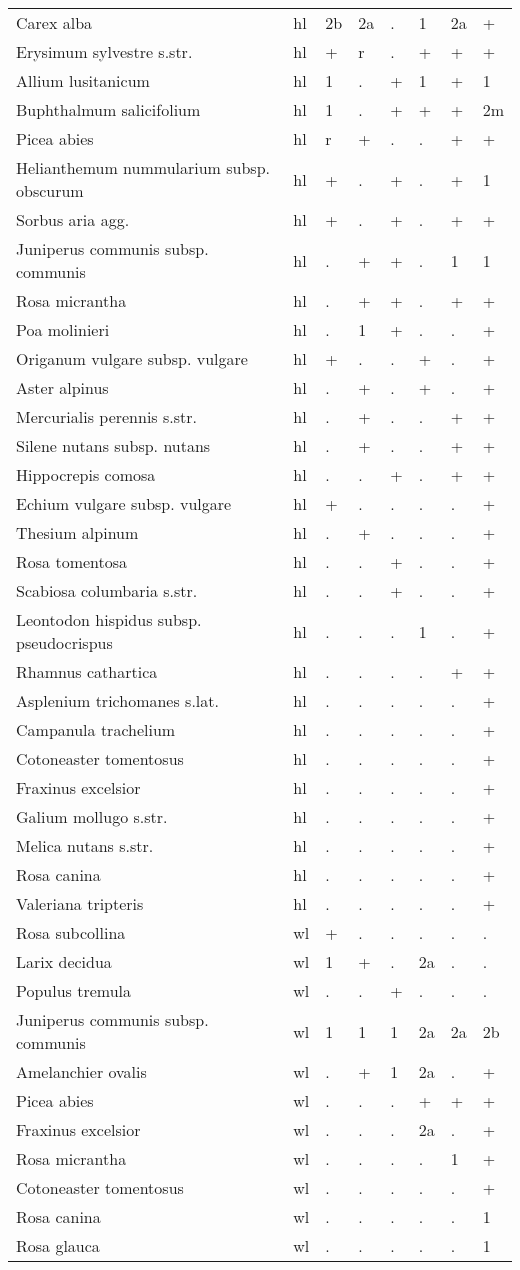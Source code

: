 \begin{longtable}{p{70mm}p{10mm}p{10mm}p{10mm}p{10mm}p{10mm}p{10mm}p{10mm}}
Carex alba&hl&2b&2a&.&1&2a&+\tabularnewline
Erysimum sylvestre s.str.&hl&+&r&.&+&+&+\tabularnewline
Allium lusitanicum&hl&1&.&+&1&+&1\tabularnewline
Buphthalmum salicifolium&hl&1&.&+&+&+&2m\tabularnewline
Picea abies&hl&r&+&.&.&+&+\tabularnewline
Helianthemum nummularium subsp. obscurum&hl&+&.&+&.&+&1\tabularnewline
Sorbus aria agg.&hl&+&.&+&.&+&+\tabularnewline
Juniperus communis subsp. communis&hl&.&+&+&.&1&1\tabularnewline
Rosa micrantha&hl&.&+&+&.&+&+\tabularnewline
Poa molinieri&hl&.&1&+&.&.&+\tabularnewline
Origanum vulgare subsp. vulgare&hl&+&.&.&+&.&+\tabularnewline
Aster alpinus&hl&.&+&.&+&.&+\tabularnewline
Mercurialis perennis s.str.&hl&.&+&.&.&+&+\tabularnewline
Silene nutans subsp. nutans&hl&.&+&.&.&+&+\tabularnewline
Hippocrepis comosa&hl&.&.&+&.&+&+\tabularnewline
Echium vulgare subsp. vulgare&hl&+&.&.&.&.&+\tabularnewline
Thesium alpinum&hl&.&+&.&.&.&+\tabularnewline
Rosa tomentosa&hl&.&.&+&.&.&+\tabularnewline
Scabiosa columbaria s.str.&hl&.&.&+&.&.&+\tabularnewline
Leontodon hispidus subsp. pseudocrispus&hl&.&.&.&1&.&+\tabularnewline
Rhamnus cathartica&hl&.&.&.&.&+&+\tabularnewline
Asplenium trichomanes s.lat.&hl&.&.&.&.&.&+\tabularnewline
Campanula trachelium&hl&.&.&.&.&.&+\tabularnewline
Cotoneaster tomentosus&hl&.&.&.&.&.&+\tabularnewline
Fraxinus excelsior&hl&.&.&.&.&.&+\tabularnewline
Galium mollugo s.str.&hl&.&.&.&.&.&+\tabularnewline
Melica nutans s.str.&hl&.&.&.&.&.&+\tabularnewline
Rosa canina&hl&.&.&.&.&.&+\tabularnewline
Valeriana tripteris&hl&.&.&.&.&.&+\tabularnewline
Rosa subcollina&wl&+&.&.&.&.&.\tabularnewline
Larix decidua&wl&1&+&.&2a&.&.\tabularnewline
Populus tremula&wl&.&.&+&.&.&.\tabularnewline
Juniperus communis subsp. communis&wl&1&1&1&2a&2a&2b\tabularnewline
Amelanchier ovalis&wl&.&+&1&2a&.&+\tabularnewline
Picea abies&wl&.&.&.&+&+&+\tabularnewline
Fraxinus excelsior&wl&.&.&.&2a&.&+\tabularnewline
Rosa micrantha&wl&.&.&.&.&1&+\tabularnewline
Cotoneaster tomentosus&wl&.&.&.&.&.&+\tabularnewline
Rosa canina&wl&.&.&.&.&.&1\tabularnewline
Rosa glauca&wl&.&.&.&.&.&1\tabularnewline
\bottomrule
 \end{longtable}
  
